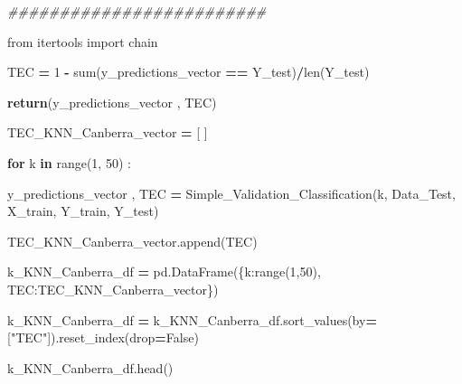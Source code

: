 \documentclass[
  11pt,
  a4paper,
]{article}
\newenvironment{Shaded}{\begin{snugshade}}{\end{snugshade}}
\newcommand{\BuiltInTok}[1]{#1}
\newcommand{\CommentTok}[1]{\textcolor[rgb]{0.56,0.35,0.01}{\textit{#1}}}
\newcommand{\ControlFlowTok}[1]{\textcolor[rgb]{0.13,0.29,0.53}{\textbf{#1}}}
\newcommand{\DecValTok}[1]{\textcolor[rgb]{0.00,0.00,0.81}{#1}}
\newcommand{\ImportTok}[1]{#1}
\newcommand{\KeywordTok}[1]{\textcolor[rgb]{0.13,0.29,0.53}{\textbf{#1}}}
\newcommand{\NormalTok}[1]{#1}
\newcommand{\OperatorTok}[1]{\textcolor[rgb]{0.81,0.36,0.00}{\textbf{#1}}}
\newcommand{\StringTok}[1]{\textcolor[rgb]{0.31,0.60,0.02}{#1}}
\newcommand{\VariableTok}[1]{\textcolor[rgb]{0.00,0.00,0.00}{#1}}
\begin{document}
\begin{Shaded}
\begin{Highlighting}[]
    \CommentTok{\#\#\#\#\#\#\#\#\#\#\#\#\#\#\#\#\#\#\#\#\#\#\#\#\#}

    \ImportTok{from}\NormalTok{ itertools }\ImportTok{import}\NormalTok{ chain}

\NormalTok{    TEC }\OperatorTok{=} \DecValTok{1} \OperatorTok{{-}} \BuiltInTok{sum}\NormalTok{(y\_predictions\_vector }\OperatorTok{==}\NormalTok{ Y\_test)}\OperatorTok{/}\BuiltInTok{len}\NormalTok{(Y\_test)     }

 
    \ControlFlowTok{return}\NormalTok{(y\_predictions\_vector , TEC)}
\end{Highlighting}
\end{Shaded}

\vspace{0.35cm}

\begin{Shaded}
\begin{Highlighting}[]
\NormalTok{TEC\_KNN\_Canberra\_vector }\OperatorTok{=}\NormalTok{ [ ]}

\ControlFlowTok{for}\NormalTok{ k }\KeywordTok{in} \BuiltInTok{range}\NormalTok{(}\DecValTok{1}\NormalTok{, }\DecValTok{50}\NormalTok{) :}

\NormalTok{    y\_predictions\_vector , TEC }\OperatorTok{=}\NormalTok{ Simple\_Validation\_Classification(k, Data\_Test, X\_train, Y\_train, Y\_test)}

\NormalTok{    TEC\_KNN\_Canberra\_vector.append(TEC)}
\end{Highlighting}
\end{Shaded}

\begin{Shaded}
\begin{Highlighting}[]
\NormalTok{k\_KNN\_Canberra\_df }\OperatorTok{=}\NormalTok{ pd.DataFrame(\{}\StringTok{\textquotesingle{}k\textquotesingle{}}\NormalTok{:}\BuiltInTok{range}\NormalTok{(}\DecValTok{1}\NormalTok{,}\DecValTok{50}\NormalTok{), }\StringTok{\textquotesingle{}TEC\textquotesingle{}}\NormalTok{:TEC\_KNN\_Canberra\_vector\})}

\NormalTok{k\_KNN\_Canberra\_df }\OperatorTok{=}\NormalTok{ k\_KNN\_Canberra\_df.sort\_values(by}\OperatorTok{=}\NormalTok{[}\StringTok{"TEC"}\NormalTok{]).reset\_index(drop}\OperatorTok{=}\VariableTok{False}\NormalTok{)}
\end{Highlighting}
\end{Shaded}

\begin{Shaded}
\begin{Highlighting}[]
\NormalTok{k\_KNN\_Canberra\_df.head()}
\end{Highlighting}
\end{Shaded}
\end{document}
